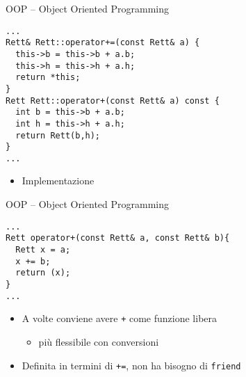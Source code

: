 \begin{frame}[fragile]{OOP -- Object Oriented Programming}
  \vfill
  \begin{lstlisting}[firstnumber=49]
...
Rett& Rett::operator+=(const Rett& a) {
  this->b = this->b + a.b;
  this->h = this->h + a.h;
  return *this;
}
Rett Rett::operator+(const Rett& a) const {
  int b = this->b + a.b;
  int h = this->h + a.h;
  return Rett(b,h);
}
...\end{lstlisting}
  \vfill
  \begin{itemize}
    \item Implementazione
  \end{itemize}
  \vfill
\end{frame}

\begin{frame}[fragile]{OOP -- Object Oriented Programming}
  \vfill
  \begin{lstlisting}[firstnumber=54]
...
Rett operator+(const Rett& a, const Rett& b){
  Rett x = a;
  x += b;
  return (x);
}
...\end{lstlisting}
  \vfill
  \begin{itemize}
    \item A volte conviene avere \lstinline$+$ come funzione libera
    \begin{itemize}
      \item più flessibile con conversioni
    \end{itemize}
    \vfill
    \item Definita in termini di \lstinline$+=$, \alert{non} ha bisogno di \lstinline$friend$
  \end{itemize}
  \vfill
\end{frame}

